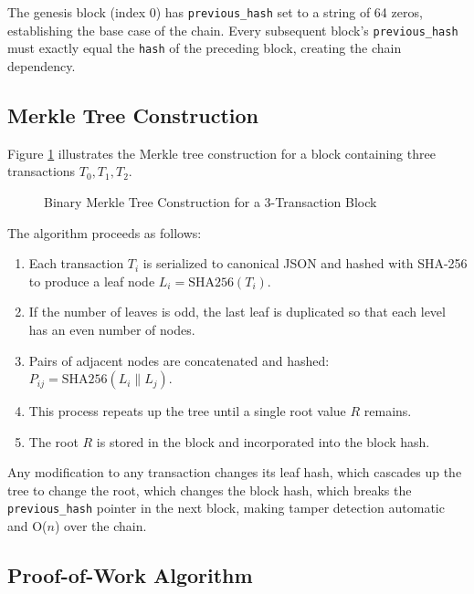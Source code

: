 \documentclass[12pt,a4paper]{report}
\begin{document}
The genesis block (index 0) has \texttt{previous\_hash} set to a string of 64 zeros,
establishing the base case of the chain. Every subsequent block's \texttt{previous\_hash}
must exactly equal the \texttt{hash} of the preceding block, creating the chain dependency.

\subsection{Merkle Tree Construction}

Figure \ref{fig:merkle} illustrates the Merkle tree construction for a block containing
three transactions $T_0, T_1, T_2$.

\begin{figure}[H]
  \centering
  \caption{Binary Merkle Tree Construction for a 3-Transaction Block}
  \label{fig:merkle}
\end{figure}

The algorithm proceeds as follows:
\begin{enumerate}[label=\arabic*.]
  \item Each transaction $T_i$ is serialized to canonical JSON and hashed with SHA-256
        to produce a leaf node $L_i = \text{SHA256}(T_i)$.
  \item If the number of leaves is odd, the last leaf is duplicated so that each level
        has an even number of nodes.
  \item Pairs of adjacent nodes are concatenated and hashed: $P_{ij} = \text{SHA256}(L_i \| L_j)$.
  \item This process repeats up the tree until a single root value $R$ remains.
  \item The root $R$ is stored in the block and incorporated into the block hash.
\end{enumerate}

Any modification to any transaction changes its leaf hash, which cascades up the tree to
change the root, which changes the block hash, which breaks the \texttt{previous\_hash}
pointer in the next block, making tamper detection automatic and O($n$) over the chain.

\subsection{Proof-of-Work Algorithm}
\end{document}

